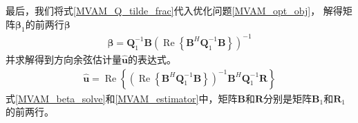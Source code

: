 \documentclass[master]{thesis-uestc}
\begin{document}
最后，我们将式\eqref{MVAM_Q_tilde_frac}代入优化问题\eqref{MVAM_opt_obj}，
解得矩阵$\bm{\beta}_1$的前两行$\bm{\beta}$
\begin{equation}\label{MVAM_beta_solve}
    \begin{aligned}
        \bm{\beta} = \bm{Q}^{-1}_1\bm{B}
        \left(\operatorname{Re}\left\{\bm{B}^H\bm{Q}^{-1}_1\bm{B}\right\}\right)^{-1}
    \end{aligned}
\end{equation}
并求解得到方向余弦估计量$\hat{\bm{u}}$的表达式。
\begin{equation}\label{MVAM_estimator}
    \begin{aligned}
        \hat{\bm{u}} = \operatorname{Re}
        \left\{
            \left(\operatorname{Re}\left\{\bm{B}^H\bm{Q}^{-1}_1\bm{B}\right\}\right)^{-1}
            \bm{B}^H\bm{Q}^{-1}_1\bm{R}
        \right\}
    \end{aligned}
\end{equation}
式\eqref{MVAM_beta_solve}和\eqref{MVAM_estimator}中，矩阵$\bm{B}$和$\bm{R}$分别是矩阵$\bm{B}_1$和$\bm{R}_1$的前两行。

\end{document}
